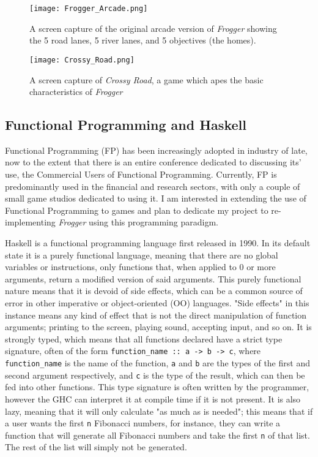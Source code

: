 \documentclass[12pt, a4paper]{report}
\begin{document}
\begin{figure}[ht]
  \centering
  \caption{A screen capture of the original arcade version of \textit{Frogger} showing the 5 road lanes, 5 river lanes, and 5 objectives (the homes).}
  \texttt{[image: Frogger\_Arcade.png]}
\end{figure}
\begin{figure}[ht]
  \centering
  \caption{A screen capture of \textit{Crossy Road}, a game which apes the basic characteristics of \textit{Frogger}}
  \texttt{[image: Crossy\_Road.png]}
\end{figure}

\subsection{Functional Programming and Haskell}
Functional Programming (FP) has been increasingly adopted in industry of late, now to the extent that there is an entire conference dedicated to discussing its' use, the Commercial Users of Functional Programming\cite{cufp}.
Currently, FP is predominantly used in the financial and research sectors, with only a couple of small game studios dedicated to using it.
I am interested in extending the use of Functional Programming to games and plan to dedicate my project to re-implementing \textit{Frogger} using this programming paradigm.

\par

Haskell is a functional programming language first released in 1990.
In its default state it is a purely functional language, meaning that there are no global variables or instructions, only functions that, when applied to 0 or more arguments, return a modified version of said arguments.
This purely functional nature means that it is devoid of side effects, which can be a common source of error in other imperative or object-oriented (OO) languages.
"Side effects" in this instance means any kind of effect that is not the direct manipulation of function arguments; printing to the screen, playing sound, accepting input, and so on.
It is strongly typed\cite{haskellsite}, which means that all functions declared have a strict type signature, often of the form \verb|function_name :: a -> b -> c|, where \verb|function_name| is the name of the function, \verb|a| and \verb|b| are the types of the first and second argument respectively, and \verb|c| is the type of the result, which can then be fed into other functions.
This type signature is often written by the programmer, however the GHC can interpret it at compile time if it is not present.
It is also lazy\cite{haskellsite}, meaning that it will only calculate "as much as is needed"; this means that if a user wants the first \verb|n| Fibonacci numbers, for instance, they can write a function that will generate all Fibonacci numbers and take the first \verb|n| of that list.
The rest of the list will simply not be generated.
\end{document}
